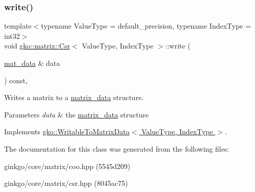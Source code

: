 \subsubsection{\texorpdfstring{write()}{write()}}
{\footnotesize\ttfamily template$<$typename Value\+Type = default\+\_\+precision, typename Index\+Type = int32$>$ \\
void \hyperlink{classgko_1_1matrix_1_1Csr}{gko\+::matrix\+::\+Csr}$<$ Value\+Type, Index\+Type $>$\+::write (\begin{DoxyParamCaption}\item[{\hyperlink{structgko_1_1matrix__data}{mat\+\_\+data} \&}]{data }\end{DoxyParamCaption}) const\hspace{0.3cm}{\ttfamily [override]}, {\ttfamily [virtual]}}



Writes a matrix to a \hyperlink{structgko_1_1matrix__data}{matrix\+\_\+data} structure. 


\begin{DoxyParams}{Parameters}
{\em data} & the \hyperlink{structgko_1_1matrix__data}{matrix\+\_\+data} structure \\
\hline
\end{DoxyParams}


Implements \hyperlink{classgko_1_1WritableToMatrixData_a96036c3a4bf4c67fa93002808b8b14e2}{gko\+::\+Writable\+To\+Matrix\+Data$<$ Value\+Type, Index\+Type $>$}.



The documentation for this class was generated from the following files\+:\begin{DoxyCompactItemize}
\item 
ginkgo/core/matrix/coo.\+hpp (5545d209)\item 
ginkgo/core/matrix/csr.\+hpp (8045ac75)\end{DoxyCompactItemize}
